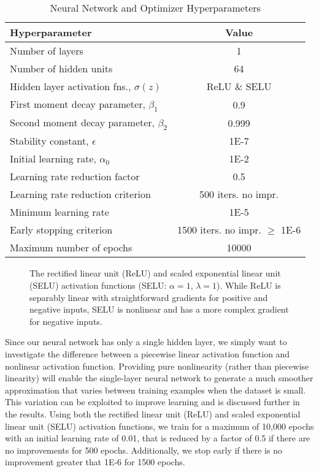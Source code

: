 \documentclass[conference]{IEEEtran}
\begin{document}
	\begin{table}[htbp]
    \renewcommand{\arraystretch}{1.0}
    \centering
    \caption{Neural Network and Optimizer Hyperparameters}
    \label{tab:nn_hyperparams}
        \begin{tabular}{lc}
        \toprule 
        \bfseries Hyperparameter & \bfseries Value \\ \midrule
	    Number of layers & 1 \\
	    Number of hidden units & 64 \\ 
	    Hidden layer activation fns., $\sigma(z)$ & ReLU \& SELU \\
	    First moment decay parameter, $\beta_1$ & 0.9 \\
	    Second moment decay parameter, $\beta_2$ & 0.999 \\
	    Stability constant, $\epsilon$ & 1E-7 \\ 
	    Initial learning rate, $\alpha_0$ & 1E-2 \\ 
	    Learning rate reduction factor & 0.5 \\
	    Learning rate reduction criterion & 500 iters. no impr. \\
	    Minimum learning rate & 1E-5 \\
	    Early stopping criterion & 1500 iters. no impr. $\ge$ 1E-6 \\ 
	    Maximum number of epochs & 10000 \\ \bottomrule
	    \end{tabular}
	\end{table}
	
	\begin{figure}[htbp]
	    \centering
	    \vspace*{-1em}
	    
	    \vspace*{-2em}
	    \caption{The rectified linear unit (ReLU) and scaled exponential linear unit (SELU) activation functions (SELU: $\alpha = 1$, $\lambda =1$). While ReLU is separably linear with straightforward gradients for positive and negative inputs, SELU is nonlinear and has a more complex gradient for negative inputs.}
	    \label{fig:activ_fns}
	\end{figure}
	
	Since our neural network has only a single hidden layer, we simply want to investigate the difference between a piecewise linear activation function and nonlinear activation function. Providing pure nonlinearity (rather than piecewise linearity) will enable the single-layer neural network to generate a much smoother approximation that varies between training examples when the dataset is small. This variation can be exploited to improve learning and is discussed further in the results. Using both the rectified linear unit (ReLU) and scaled exponential linear unit (SELU) activation functions, we train for a maximum of 10,000 epochs with an initial learning rate of 0.01, that is reduced by a factor of 0.5 if there are no improvements for 500 epochs. Additionally, we stop early if there is no improvement greater that 1E-6 for 1500 epochs.
	
\end{document}
